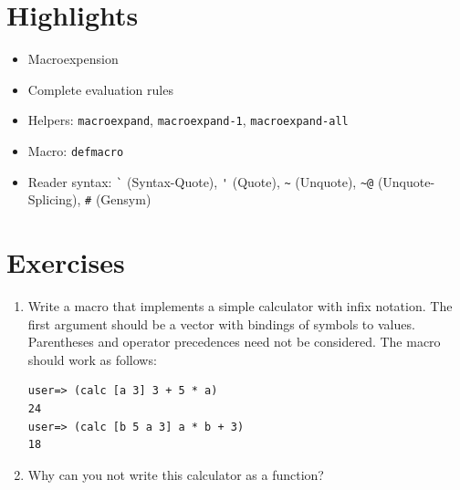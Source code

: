 \documentclass[11pt,a4paper]{article}
\begin{document}
\section{Highlights}

\begin{itemize}
    \item Macroexpension
    \item Complete evaluation rules
    \item Helpers: \verb|macroexpand|, \verb|macroexpand-1|, \verb|macroexpand-all|
    \item Macro: \verb|defmacro|
    \item Reader syntax: \verb|`| (Syntax-Quote), \verb|'| (Quote), \verb|~| (Unquote), \verb|~@| (Unquote-Splicing), \verb|#| (Gensym)
\end{itemize}



\section{Exercises}

\begin{exercise}[Macro]
\begin{enumerate}[label=\alph*)]
\item
Write a macro that implements a simple calculator with infix notation. The first argument should be a vector with bindings of symbols to values. Parentheses and operator precedences need not be considered. The macro should work as follows:
\begin{verbatim}
user=> (calc [a 3] 3 + 5 * a)
24
user=> (calc [b 5 a 3] a * b + 3)
18
\end{verbatim}
\item Why can you not write this calculator as a function?
\end{enumerate}
\end{exercise}
\end{document}
